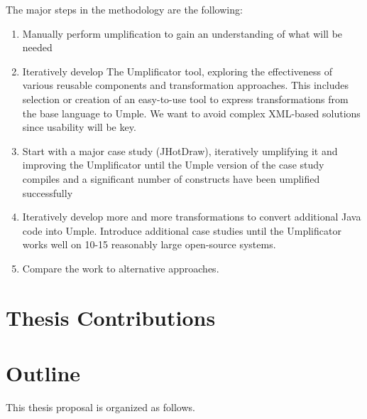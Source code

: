 The major steps in the methodology are the following:
\begin{enumerate}
\item 	Manually perform umplification to gain an understanding of what will be needed
\item 	Iteratively develop The Umplificator tool, exploring the effectiveness of various reusable components and transformation approaches. This includes selection or creation of an easy-to-use tool to express transformations from the base language to Umple. We want to avoid complex XML-based solutions since usability will be key.
\item 	Start with a major case study (JHotDraw), iteratively umplifying it and improving the Umplificator until the Umple version of the case study compiles and a significant number of constructs have been umplified successfully
\item 	Iteratively develop more and more transformations to convert additional Java code into Umple. Introduce additional case studies until the Umplificator works well on 10-15 reasonably large open-source systems.
\item 	Compare the work to alternative approaches.
\end{enumerate}



\section{Thesis Contributions}
\section{Outline}
This thesis proposal is organized as follows.

